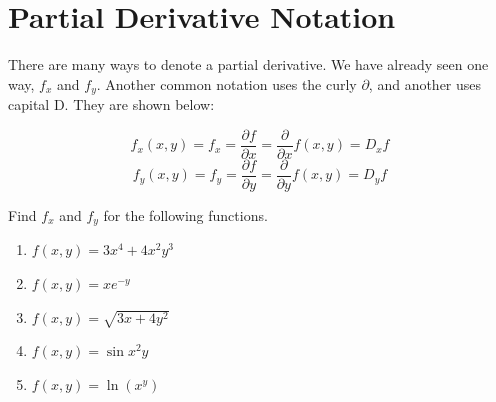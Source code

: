 \section{Partial Derivative Notation}
There are many ways to denote a partial derivative. We have already seen one way,
$f_x$ and $f_y$. Another common notation uses the curly $\partial$, 
and another uses capital D. They are shown below:

\begin{mdframed}[style = important, frametitle = {Partial Derivative Notations}]
$$f_x(x, y) = f_x = \frac{\partial f}{\partial x} = \frac{\partial}{\partial x}
f(x, y) = D_x f$$
$$f_y(x, y) = f_y = \frac{\partial f}{\partial y} = \frac{\partial}{\partial y}
f(x, y) = D_y f$$
\end{mdframed}

\begin{Exercise}[title = {First Partial Derivatives}, label = first]
Find $f_x$ and $f_y$ for the following functions.
\begin{enumerate}
\item $f(x, y) = 3x^4 + 4x^2y^3$
\item $f(x, y) = xe^{-y}$
\item $f(x, y) = \sqrt{3x + 4y^2}$
\item $f(x, y) = \sin{x^2y}$
\item $f(x, y) = \ln{ \left(x^y \right)}$
\end{enumerate}
\end{Exercise}

